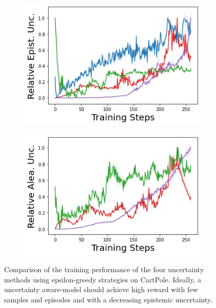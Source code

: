 \begin{figure}
\begin{subfigure}{.245\textwidth}
    \end{subfigure}
    \begin{subfigure}{.245\textwidth}
        \includegraphics[width=\textwidth]{sections/011_icml2022/resources/cartpole-training_epistemic_uncertainty-training-model.png}
    \end{subfigure}
    \begin{subfigure}{.245\textwidth}
        \includegraphics[width=\textwidth]{sections/011_icml2022/resources/cartpole-training_aleatoric_ucertainty-training-model.png}  
    \end{subfigure}
    \caption{Comparison of the training performance of the four uncertainty methods using epsilon-greedy strategies on CartPole. Ideally, a uncertainty aware-model should achieve high reward with few samples and episodes and with a decreasing epistemic uncertainty.}
    \label{fig:model-training-performance-cartpole}
\end{figure}